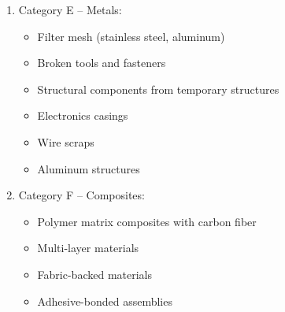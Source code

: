 \documentclass[12pt, a4paper]{article}
\begin{document}
\begin{enumerate}
    \item{Category E -- Metals: }
    \begin{itemize}
        \item Filter mesh (stainless steel, aluminum)
        \item Broken tools and fasteners
        \item Structural components from temporary structures
        \item Electronics casings
        \item Wire scraps
        \item Aluminum structures
    \end{itemize}

    \item{Category F -- Composites: }
    \begin{itemize}
        \item Polymer matrix composites with carbon fiber
        \item Multi-layer materials
        \item Fabric-backed materials
        \item Adhesive-bonded assemblies
    \end{itemize}
\end{enumerate}
\end{document}
